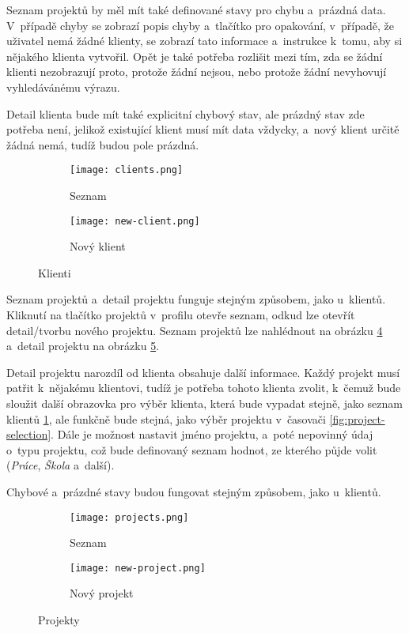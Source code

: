 Seznam projektů by měl mít také definované stavy pro chybu a~prázdná data. V~případě chyby se zobrazí popis chyby a~tlačítko pro opakování, v~případě, že uživatel nemá žádné klienty, se zobrazí tato informace a~instrukce k~tomu, aby si nějakého klienta vytvořil. Opět je také potřeba rozlišit mezi tím, zda se žádní klienti nezobrazují proto, protože žádní nejsou, nebo protože žádní nevyhovují vyhledávánému výrazu.

Detail klienta bude mít také explicitní chybový stav, ale prázdný stav zde potřeba není, jelikož existující klient musí mít data vždycky, a~nový klient určitě žádná nemá, tudíž budou pole prázdná.

\begin{figure}[h]
    \centering
    \begin{subfigure}[b]{0.4\textwidth}
		\centering
		\texttt{[image: clients.png]}
		\caption{Seznam}
		\label{fig:client-list}
	\end{subfigure}
	\hspace{2cm}
	\begin{subfigure}[b]{0.4\textwidth}
		\centering
		\texttt{[image: new-client.png]}
		\caption{Nový klient}
		\label{fig:new-client}
	\end{subfigure}
	\caption{Klienti}
	\label{fig:clients}
\end{figure}

Seznam projektů a~detail projektu funguje stejným způsobem, jako u~klientů. Kliknutí na tlačítko projektů v~profilu otevře seznam, odkud lze otevřít detail/tvorbu nového projektu. Seznam projektů lze nahlédnout na obrázku \ref{fig:project-list} a~detail projektu na obrázku \ref{fig:new-project}.

Detail projektu narozdíl od klienta obsahuje další informace. Každý projekt musí patřit k~nějakému klientovi, tudíž je potřeba tohoto klienta zvolit, k~čemuž bude sloužit další obrazovka pro výběr klienta, která bude vypadat stejně, jako seznam klientů \ref{fig:client-list}, ale funkčně bude stejná, jako výběr projektu v~časovači \ref{fig:project-selection}. Dále je možnost nastavit jméno projektu, a~poté nepovinný údaj o~typu projektu, což bude definovaný seznam hodnot, ze kterého půjde volit (\emph{Práce}, \emph{Škola} a~další).

Chybové a~prázdné stavy budou fungovat stejným způsobem, jako u~klientů.

\begin{figure}[h]
    \centering
    \begin{subfigure}[b]{0.4\textwidth}
		\centering
		\texttt{[image: projects.png]}
		\caption{Seznam}
		\label{fig:project-list}
	\end{subfigure}
	\hspace{2cm}
	\begin{subfigure}[b]{0.4\textwidth}
		\centering
		\texttt{[image: new-project.png]}
		\caption{Nový projekt}
		\label{fig:new-project}
	\end{subfigure}
	\caption{Projekty}
	\label{fig:projects}
\end{figure}

